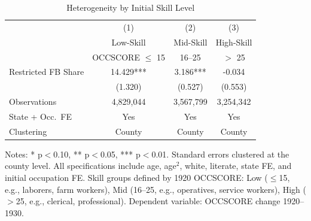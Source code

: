 \begin{table}[H]
\centering
\caption{Heterogeneity by Initial Skill Level}
\begin{threeparttable}
\begin{tabular}{lccc}
\toprule
& (1) & (2) & (3) \\
& Low-Skill & Mid-Skill & High-Skill \\
& OCCSCORE $\leq$ 15 & 16--25 & $>$ 25 \\
\midrule
Restricted FB Share & 14.429*** & 3.186*** & -0.034 \\
& (1.320) & (0.527) & (0.553) \\
\midrule
Observations & 4,829,044 & 3,567,799 & 3,254,342 \\
State + Occ.\ FE & Yes & Yes & Yes \\
Clustering & County & County & County \\
\bottomrule
\end{tabular}
\begin{tablenotes}[flushleft]
\small
\item Notes: * p$<$0.10, ** p$<$0.05, *** p$<$0.01. Standard errors clustered at the county level. All specifications include age, age$^2$, white, literate, state FE, and initial occupation FE. Skill groups defined by 1920 OCCSCORE: Low ($\leq$15, e.g., laborers, farm workers), Mid (16--25, e.g., operatives, service workers), High ($>$25, e.g., clerical, professional). Dependent variable: OCCSCORE change 1920--1930.
\end{tablenotes}
\end{threeparttable}
\label{tab:heterogeneity}
\end{table}

